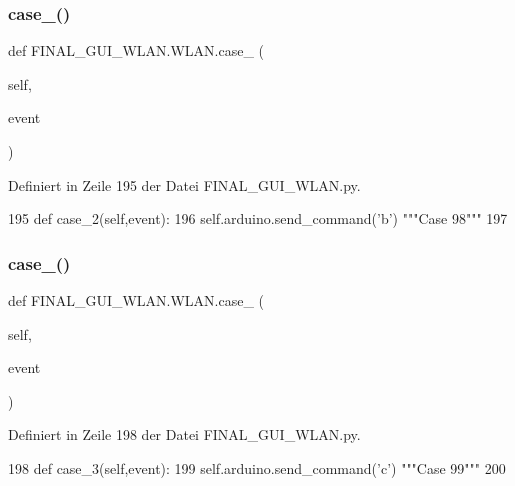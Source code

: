\subsubsection{\texorpdfstring{case\+\_()}{case\_2()}}
{\footnotesize\ttfamily def F\+I\+N\+A\+L\+\_\+\+G\+U\+I\+\_\+\+W\+L\+A\+N.\+W\+L\+A\+N.\+case\+\_ (\begin{DoxyParamCaption}\item[{}]{self,  }\item[{}]{event }\end{DoxyParamCaption})}



Definiert in Zeile 195 der Datei F\+I\+N\+A\+L\+\_\+\+G\+U\+I\+\_\+\+W\+L\+A\+N.\+py.


\begin{DoxyCode}
195     \textcolor{keyword}{def }case\_2(self,event):
196         self.arduino.send\_command(\textcolor{stringliteral}{'b'})  \textcolor{stringliteral}{"""Case 98"""}
197 
\end{DoxyCode}
\mbox{\label{class_f_i_n_a_l___g_u_i___w_l_a_n_1_1_w_l_a_n_a7f8af09fe47e662758efbe42031b3fb8}} 
\subsubsection{\texorpdfstring{case\+\_()}{case\_3()}}
{\footnotesize\ttfamily def F\+I\+N\+A\+L\+\_\+\+G\+U\+I\+\_\+\+W\+L\+A\+N.\+W\+L\+A\+N.\+case\+\_ (\begin{DoxyParamCaption}\item[{}]{self,  }\item[{}]{event }\end{DoxyParamCaption})}



Definiert in Zeile 198 der Datei F\+I\+N\+A\+L\+\_\+\+G\+U\+I\+\_\+\+W\+L\+A\+N.\+py.


\begin{DoxyCode}
198     \textcolor{keyword}{def }case\_3(self,event):
199         self.arduino.send\_command(\textcolor{stringliteral}{'c'})  \textcolor{stringliteral}{"""Case 99"""}
200     
\end{DoxyCode}
\mbox{\label{class_f_i_n_a_l___g_u_i___w_l_a_n_1_1_w_l_a_n_a6a47080307455eebf0bca74834d01077}} 
